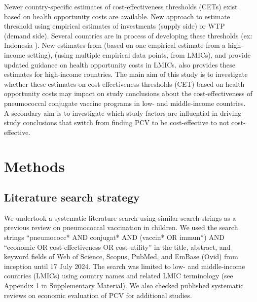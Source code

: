 \documentclass[12pt]{article}
\begin{document}
Newer country-specific estimates of cost-effectiveness thresholds (CETs) exist based on health opportunity costs are available. \autocite{woods_country-level_2016, ochalek_estimating_2018, pichon-riviere_determining_2023} New approach to estimate threshold using empirical estimates of investments (supply side) or WTP (demand side). Several countries are in process of developing these thresholds (ex: Indonesia ). New estimates from \autocite{woods_country-level_2016} (based on one empirical estimate from a high-income setting), \autocite{ochalek_estimating_2018} (using multiple empirical data points, from LMICs), and \autocite{pichon-riviere_determining_2023} provide updated guidance on health opportunity costs in LMICs. \autocite{woods_country-level_2016} also provides these estimates for high-income countries. The main aim of this study is to investigate whether these estimates on cost-effectiveness thresholds (CET) based on health opportunity costs may impact on study conclusions about the cost-effectiveness of pneumococcal conjugate vaccine programs in low- and middle-income countries. A secondary aim is to investigate which study factors are influential in driving study conclusions that switch from finding PCV to be cost-effective to not cost-effective.


\section{Methods}
\subsection{Literature search strategy}
We undertook a systematic literature search using similar search strings as a previous review on pneumococcal vaccination in children.\autocite{saokaew_cost_2016} We used the search strings “pneumococc* AND conjugat* AND (vaccin* OR immun*) AND “economic OR cost-effectiveness OR cost-utility” in the title, abstract, and keyword fields of Web of Science, Scopus, PubMed, and EmBase (Ovid) from inception until 17 July 2024. The search was limited to low- and middle-income countries (LMICs) using country names and related LMIC terminology (see Appendix 1 in Supplementary Material). We also checked published systematic reviews on economic evaluation of PCV for additional studies.\autocite{saokaew_cost_2016, syeed_pneumococcal_2023, wang_systematic_2022, zakiyah_pneumococcal_2020}
\end{document}
